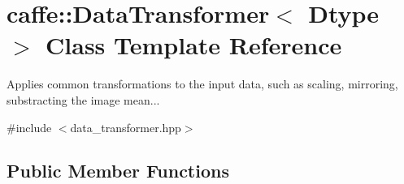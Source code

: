 \hypertarget{classcaffe_1_1_data_transformer}{}\section{caffe\+:\+:Data\+Transformer$<$ Dtype $>$ Class Template Reference}
\label{classcaffe_1_1_data_transformer}


Applies common transformations to the input data, such as scaling, mirroring, substracting the image mean...  




{\ttfamily \#include $<$data\+\_\+transformer.\+hpp$>$}

\subsection*{Public Member Functions}
